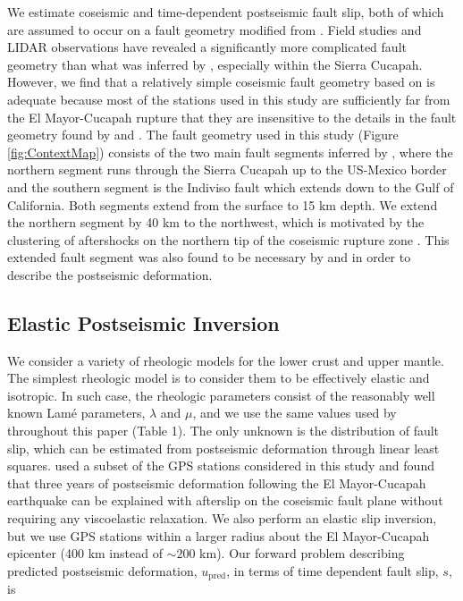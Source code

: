 \documentclass[draft,linenumbers]{AGUJournal}
\begin{document}
We estimate coseismic and time-dependent postseismic fault slip, both of which are assumed to occur on a fault geometry modified from \citet{Wei2011}.  Field studies \citep{Fletcher2014} and LIDAR observations \citep{Oskin2012} have revealed a significantly more complicated fault geometry than what was inferred by \citet{Wei2011}, especially within the Sierra Cucapah.  However, we find that a relatively simple coseismic fault geometry based on \citep{Wei2011} is adequate because most of the stations used in this study are sufficiently far from the El Mayor-Cucapah rupture that they are insensitive to the details in the fault geometry found by \citet{Fletcher2014} and \citet{Oskin2012}.  The fault geometry used in this study (Figure \ref{fig:ContextMap}) consists of the two main fault segments inferred by \citet{Wei2011}, where the northern segment runs through the Sierra Cucapah up to the US-Mexico border and the southern segment is the Indiviso fault which extends down to the Gulf of California. Both segments extend from the surface to 15 km depth.  We extend the northern segment by 40 km to the northwest, which is motivated by the clustering of aftershocks on the northern tip of the coseismic rupture zone \citep{Hauksson2011,Kroll2013}.  This extended fault segment was also found to be necessary by \citet{Rollins2015} and \citet{Pollitz2012} in order to describe the postseismic deformation. 

\subsection{Elastic Postseismic Inversion}\label{sec:ElasticInversion}    
We consider a variety of rheologic models for the lower crust and upper mantle. The simplest rheologic model is to consider them to be effectively elastic and isotropic.  In such case, the rheologic parameters consist of the reasonably well known Lam\'e parameters, $\lambda$ and $\mu$, and we use the same values used by \citet{Wei2011} throughout this paper (Table 1).  The only unknown is the distribution of fault slip, which can be estimated from postseismic deformation through linear least squares.  \citet{Rollins2015} used a subset of the GPS stations considered in this study and found that three years of postseismic deformation following the El Mayor-Cucapah earthquake can be explained with afterslip on the coseismic fault plane without requiring any viscoelastic relaxation. We also perform an elastic slip inversion, but we use GPS stations within a larger radius about the El Mayor-Cucapah epicenter (400 km instead of ${\sim}200$ km). Our forward problem describing predicted postseismic deformation, $u_\mathrm{pred}$, in terms of time dependent fault slip, $s$, is
\end{document}
